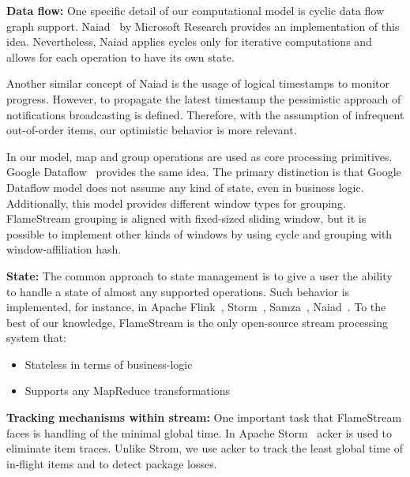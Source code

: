 
\label {fs-related-section}

{\bf Data flow:}
One specific detail of our computational model is cyclic data flow graph support. Naiad~\cite{Murray:2013:NTD:2517349.2522738} by Microsoft Research provides an implementation of this idea. Nevertheless, Naiad applies cycles only for iterative computations and allows for each operation to have its own state. 

Another similar concept of Naiad is the usage of logical timestamps to monitor progress. However, to propagate the latest timestamp the pessimistic approach of notifications broadcasting is defined. Therefore, with the assumption of infrequent out-of-order items, our optimistic behavior is more relevant.

In our model, map and group operations are used as core processing primitives. Google Dataflow~\cite{Akidau:2015:DMP:2824032.2824076} provides the same idea. The primary distinction is that Google Dataflow model does not assume any kind of state, even in business logic. Additionally, this model provides different window types for grouping. FlameStream grouping is aligned with fixed-sized sliding window, but it is possible to implement other kinds of windows by using cycle and grouping with window-affiliation hash.

{\bf State:}
The common approach to state management is to give a user the ability to handle a state of almost any supported operations. Such behavior is implemented, for instance, in Apache Flink~\cite{carbone2015apache}, Storm~\cite{apache:storm}, Samza~\cite{Noghabi:2017:SSS:3137765.3137770}, Naiad~\cite{Murray:2013:NTD:2517349.2522738}.
To the best of our knowledge, FlameStream is the only open-source stream processing system that:
\begin{itemize}
    \item Stateless in terms of business-logic
    \item Supports any MapReduce transformations 
\end{itemize}

{\bf Tracking mechanisms within stream:}
One important task that FlameStream faces is handling of the minimal global time. In Apache Storm~\cite{apache:storm} acker is used to eliminate item traces. Unlike Strom, we use acker to track the least global time of in-flight items and to detect package losses.

